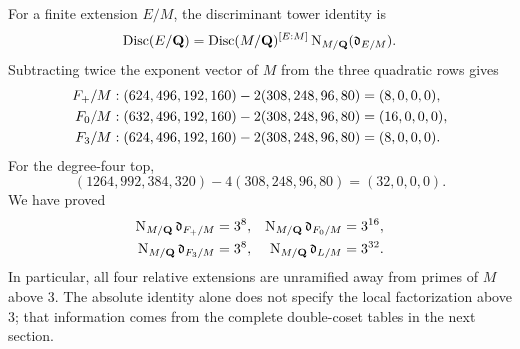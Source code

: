 For a finite extension $E/M$, the discriminant tower identity is
\begin{equation}
 \operatorname{Disc}(E/\mathbf{Q})=\operatorname{Disc}(M/\mathbf{Q})^{[E:M]}
        \operatorname{N}_{M/\mathbf{Q}}(\mathfrak d_{E/M}).
 \label{eq:disc-tower}
\end{equation}
Subtracting twice the exponent vector of $M$ from the three quadratic rows
gives
\begin{align*}
 F_{+}/M &: (624,496,192,160)-2(308,248,96,80)=(8,0,0,0),\\
 F_{0}/M &: (632,496,192,160)-2(308,248,96,80)=(16,0,0,0),\\
 F_{3}/M &: (624,496,192,160)-2(308,248,96,80)=(8,0,0,0).
\end{align*}
For the degree-four top,
\[
 (1264,992,384,320)-4(308,248,96,80)=(32,0,0,0).
\]
We have proved
\begin{equation}
\begin{aligned}
 \operatorname{N}_{M/\mathbf{Q}}\mathfrak d_{F_{+}/M}&=3^8,&
 \operatorname{N}_{M/\mathbf{Q}}\mathfrak d_{F_{0}/M}&=3^{16},\\
 \operatorname{N}_{M/\mathbf{Q}}\mathfrak d_{F_{3}/M}&=3^8,&
 \operatorname{N}_{M/\mathbf{Q}}\mathfrak d_{L/M}&=3^{32}.
\end{aligned}
\label{eq:relative-norms}
\end{equation}
In particular, all four relative extensions are unramified away from primes
of $M$ above $3$.  The absolute identity alone does not specify the local
factorization above $3$; that information comes from the complete
double-coset tables in the next section.

